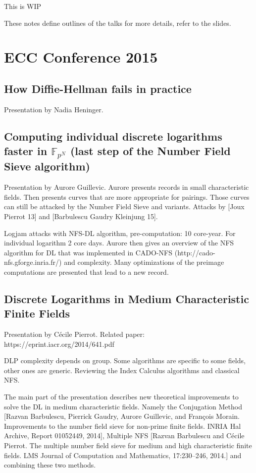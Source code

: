 \documentclass[11pt]{article}
\begin{document}
This is WIP

These notes define outlines of the talks for more details, refer to the slides.
\section{ECC Conference 2015}


\subsection{How Diffie-Hellman fails in practice}
Presentation by Nadia Heninger.

\subsection{Computing individual discrete logarithms faster in $\mathbb{F}_{p^N}$ (last step of the Number Field Sieve algorithm)}
Presentation by Aurore Guillevic. Aurore presents records in small characteristic fields. Then presents curves that are more appropriate for pairings. Those curves can still be attacked by the Number Field Sieve and variants. Attacks by [Joux Pierrot 13] and [Barbulescu Gaudry Kleinjung 15].

Logjam attacks with NFS-DL algorithm, pre-computation: 10 core-year. For individual logarithm 2 core days. Aurore then gives an overview of the NFS algorithm for DL that was implemented in CADO-NFS (http://cado-nfs.gforge.inria.fr/) and complexity. Many optimizations of the preimage computations are presented that lead to a new record.

\subsection{Discrete Logarithms in Medium Characteristic Finite Fields}
Presentation by Cécile Pierrot. Related paper: https://eprint.iacr.org/2014/641.pdf

DLP complexity depends on group. Some algorithms are specific to some fields, other ones are generic. Reviewing the Index Calculus algorithms and classical NFS.

The main part of the presentation describes new theoretical improvements to solve the DL in medium characteristic fields. Namely the Conjugation Method [Razvan Barbulescu, Pierrick Gaudry, Aurore Guillevic, and François
Morain. Improvements to the number field sieve for non-prime finite fields.
INRIA Hal Archive, Report 01052449, 2014], Multiple NFS [Razvan Barbulescu and Cécile Pierrot. The multiple number field sieve for
medium and high characteristic finite fields. LMS Journal of Computation
and Mathematics, 17:230–246, 2014.] and combining these two methods.
\end{document}
